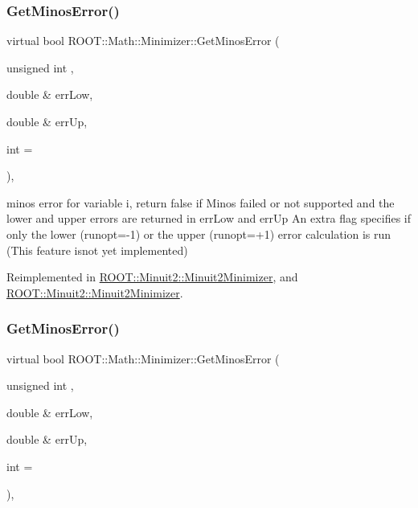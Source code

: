 \mbox{\label{classROOT_1_1Math_1_1Minimizer_aeaef75b766eff7088939259c842ab056}} 
\subsubsection{\texorpdfstring{GetMinosError()}{GetMinosError()}\hspace{0.1cm}{\footnotesize\ttfamily [1/2]}}
{\footnotesize\ttfamily virtual bool R\+O\+O\+T\+::\+Math\+::\+Minimizer\+::\+Get\+Minos\+Error (\begin{DoxyParamCaption}\item[{unsigned int}]{,  }\item[{double \&}]{err\+Low,  }\item[{double \&}]{err\+Up,  }\item[{int}]{ = {} }\end{DoxyParamCaption})\hspace{0.3cm}{\ttfamily [inline]}, {\ttfamily [virtual]}}

minos error for variable i, return false if Minos failed or not supported and the lower and upper errors are returned in err\+Low and err\+Up An extra flag specifies if only the lower (runopt=-\/1) or the upper (runopt=+1) error calculation is run (This feature isnot yet implemented) 

Reimplemented in \mbox{\hyperlink{classROOT_1_1Minuit2_1_1Minuit2Minimizer_ab6c27c6f165821774dd304561e8956f5}{R\+O\+O\+T\+::\+Minuit2\+::\+Minuit2\+Minimizer}}, and \mbox{\hyperlink{classROOT_1_1Minuit2_1_1Minuit2Minimizer_ab6c27c6f165821774dd304561e8956f5}{R\+O\+O\+T\+::\+Minuit2\+::\+Minuit2\+Minimizer}}.

\mbox{\label{classROOT_1_1Math_1_1Minimizer_aeaef75b766eff7088939259c842ab056}} 
\subsubsection{\texorpdfstring{GetMinosError()}{GetMinosError()}\hspace{0.1cm}{\footnotesize\ttfamily [2/2]}}
{\footnotesize\ttfamily virtual bool R\+O\+O\+T\+::\+Math\+::\+Minimizer\+::\+Get\+Minos\+Error (\begin{DoxyParamCaption}\item[{unsigned int}]{,  }\item[{double \&}]{err\+Low,  }\item[{double \&}]{err\+Up,  }\item[{int}]{ = {} }\end{DoxyParamCaption})\hspace{0.3cm}{\ttfamily [inline]}, {\ttfamily [virtual]}}

